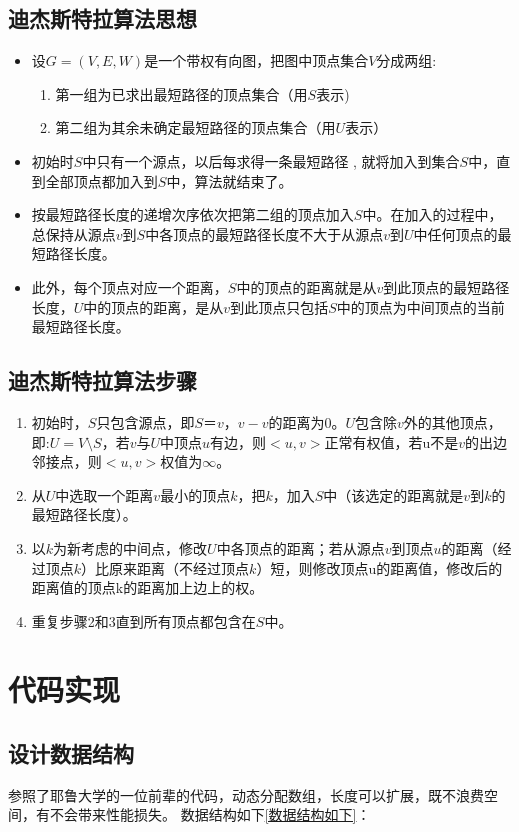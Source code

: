 \documentclass[a4paper,10pt]{ctexart}
\begin{document}
\subsection{迪杰斯特拉算法思想}
\begin{itemize}
\item 设$G=(V,E,W)$是一个带权有向图，把图中顶点集合$V$分成两组:
    \begin{enumerate}
    \item 第一组为已求出最短路径的顶点集合（用$S$表示)
    \item 第二组为其余未确定最短路径的顶点集合（用$U$表示）
    \end{enumerate}
\item 初始时$S$中只有一个源点，以后每求得一条最短路径 , 就将加入到集合$S$中，直到全部顶点都加入到$S$中，算法就结束了。
\item 按最短路径长度的递增次序依次把第二组的顶点加入$S$中。在加入的过程中，总保持从源点$v$到$S$中各顶点的最短路径长度不大于从源点$v$到$U$中任何顶点的最短路径长度。
\item 此外，每个顶点对应一个距离，$S$中的顶点的距离就是从$v$到此顶点的最短路径长度，$U$中的顶点的距离，是从$v$到此顶点只包括$S$中的顶点为中间顶点的当前最短路径长度。
\end{itemize}
\subsection{迪杰斯特拉算法步骤}
\begin{enumerate}
  \item 初始时，$S$只包含源点，即$S＝{v}$，$v-v$的距离为0。$U$包含除$v$外的其他顶点，即:$U=V \setminus S$，若$v$与$U$中顶点$u$有边，则$<u,v>$正常有权值，若u不是$v$的出边邻接点，则$<u,v>$权值为$ \infty $。
  \item 从$U$中选取一个距离$v$最小的顶点$k$，把$k$，加入$S$中（该选定的距离就是$v$到$k$的最短路径长度）。
  \item 以$k$为新考虑的中间点，修改$U$中各顶点的距离；若从源点$v$到顶点$u$的距离（经过顶点$k$）比原来距离（不经过顶点$k$）短，则修改顶点u的距离值，修改后的距离值的顶点k的距离加上边上的权。
  \item 重复步骤2和3直到所有顶点都包含在$S$中。
\end{enumerate}

\section{代码实现}
\subsection{设计数据结构}
参照了耶鲁大学的一位前辈的代码，动态分配数组，长度可以扩展，既不浪费空间，有不会带来性能损失。
数据结构如下\ref{数据结构如下}：
\end{document}

